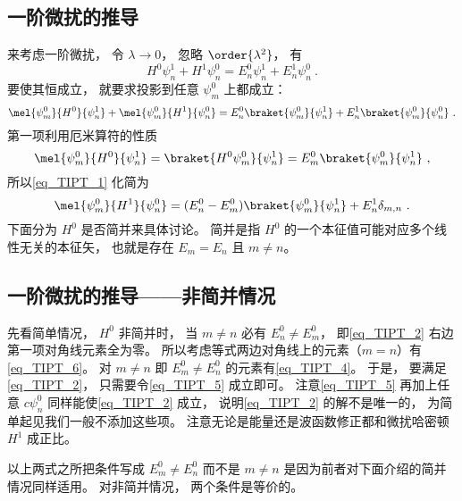 \subsection{一阶微扰的推导}
来考虑一阶微扰， 令 $\lambda \to 0$， 忽略 $\order{\lambda^2}$， 有
\begin{equation}
H^0\psi_n^1 + H^1 \psi_n^0 = E_n^0 \psi_n^1 + E_n^1 \psi_n^0~.
\end{equation}
要使其恒成立， 就要求投影到任意 $\psi_m^0$ 上都成立：
\begin{equation}\label{eq_TIPT_1}
\mel{\psi_m^0}{H^0}{\psi_n^1} + \mel{\psi_m^0}{H^1}{\psi_n^0} = E_n^0 \braket{\psi_m^0}{\psi_n^1} + E_n^1 \braket{\psi_m^0}{\psi_n^0}~.
\end{equation}
第一项利用厄米算符的性质
\begin{equation}
\mel{\psi_m^0}{H^0}{\psi_n^1} = \braket{H^0\psi_m^0}{\psi_n^1} = E_m^0\braket{\psi_m^0}{\psi_n^1}~,
\end{equation}
所以\autoref{eq_TIPT_1} 化简为
\begin{equation}\label{eq_TIPT_2}
\mel{\psi_m^0}{H^1}{\psi_n^0} = (E_n^0 - E_m^0) \braket{\psi_m^0}{\psi_n^1} + E_n^1 \delta_{m,n}~.
\end{equation}
下面分为 $H^0$ 是否简并来具体讨论。 简并是指 $H^0$ 的一个本征值可能对应多个线性无关的本征矢， 也就是存在 $E_m=E_n$ 且 $m\ne n$。

\subsection{一阶微扰的推导——非简并情况}\label{sub_TIPT_1}
先看简单情况， $H^0$ 非简并时， 当 $m\ne n$ 必有 $E_n^0 \ne E_m^0$， 即\autoref{eq_TIPT_2} 右边第一项对角线元素全为零。 所以考虑等式两边对角线上的元素（$m = n$）有\autoref{eq_TIPT_6}。 对 $m \ne n$ 即 $E_m^0 \ne E_n^0$ 的元素有\autoref{eq_TIPT_4}。 于是， 要满足\autoref{eq_TIPT_2}， 只需要令\autoref{eq_TIPT_5} 成立即可。 注意\autoref{eq_TIPT_5} 再加上任意 $c \psi_n^0$ 同样能使\autoref{eq_TIPT_2} 成立， 说明\autoref{eq_TIPT_2} 的解不是唯一的， 为简单起见我们一般不添加这些项。 注意无论是能量还是波函数修正都和微扰哈密顿 $H^1$ 成正比。

以上两式之所把条件写成 $E_m^0 \ne E_n^0$ 而不是 $m \ne n$ 是因为前者对下面介绍的简并情况同样适用。 对非简并情况， 两个条件是等价的。

